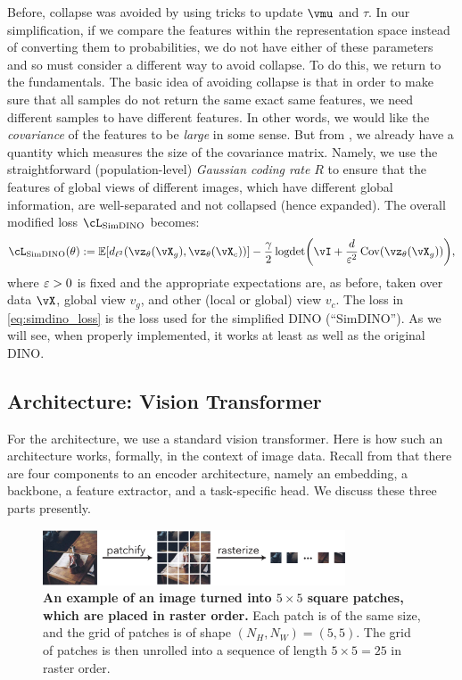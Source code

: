 \documentclass[../../book-main.tex]{subfiles}
\begin{document}
Before, collapse was avoided by using tricks to update \(\vmu\) and \(\tau\). In our simplification, if we compare the features within the representation space instead of converting them to probabilities, we do not have either of these parameters and so must consider a different way to avoid collapse. To do this, we return to the fundamentals. The basic idea of avoiding collapse is that in order to make sure that all samples do not return the same exact same features, we need different samples to have different features. In other words, we would like the \textit{covariance} of the features to be \textit{large} in some sense. But from , we already have a quantity which measures the size of the covariance matrix. Namely, we use the straightforward (population-level) \textit{Gaussian coding rate} \(R\) to ensure that the features of global views of different images, which have different global information, are well-separated and not collapsed (hence expanded). The overall modified loss \(\cL_{\simdino}\) becomes:
\begin{equation}\label{eq:simdino_loss}
    \cL_{\simdino}(\theta) := \Ex[d_{\ell^{2}}(\vz_{\theta}(\vX_{g}), \vz_{\theta}(\vX_{c}))] - \frac{\gamma}{2}\logdet\rp{\vI + \frac{d}{\eps^{2}}\Cov(\vz_{\theta}(\vX_{g}))},
\end{equation}
where \(\varepsilon > 0\) is fixed and the appropriate expectations are, as before, taken over data \(\vX\), global view \(v_{g}\), and other (local or global) view \(v_{c}\). The loss in \eqref{eq:simdino_loss} is the loss used for the simplified DINO (``SimDINO''). As we will see, when properly implemented, it works at least as well as the original DINO.

\subsection{Architecture: Vision Transformer}\label{sub:contrastive_learning_architecture}

For the architecture, we use a standard vision transformer. Here is how such an architecture works, formally, in the context of image data. Recall from  that there are four components to an encoder architecture, namely an embedding, a backbone, a feature extractor, and a task-specific head. We discuss these three parts presently.

\begin{figure}
    \centering 
    \includegraphics[width=0.8\textwidth]{figs_chap7/patchify.pdf}
    \caption{\small\textbf{An example of an image turned into \(5 \times 5\) square patches, which are placed in raster order.} Each patch is of the same size, and the grid of patches is of shape \((N_{H}, N_{W}) = (5, 5)\). The grid of patches is then unrolled into a sequence of length \(5 \times 5 = 25\) in raster order.}
    \label{fig:patchify_rasterize}
\end{figure}
\end{document}
